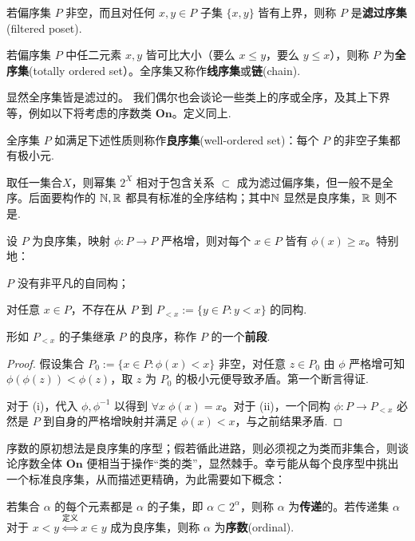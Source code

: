 \begin{definition}
	若偏序集 $P$ 非空，而且对任何 $x,y \in P$ 子集 $\{x,y\}$ 皆有上界，则称 $P$ 是\textbf{滤过序集}(filtered poset).
\end{definition}

\begin{definition}
	若偏序集 $P$ 中任二元素 $x,y$ 皆可比大小（要么 $x \leqslant y$，要么 $y \leqslant x$），则称 $P$ 为\textbf{全序集}(totally ordered set）。全序集又称作\textbf{线序集}或\textbf{链}(chain).
\end{definition}
显然全序集皆是滤过的。
我们偶尔也会谈论一些类上的序或全序，及其上下界等，例如以下将考虑的序数类 $\mathbf{On}$。定义同上.

\begin{definition}[Cantor]
	全序集 $P$ 如满足下述性质则称作\textbf{良序集}(well-ordered set)：每个 $P$ 的非空子集都有极小元.
\end{definition}

\begin{example}
	取任一集合$X$，则幂集 $2^X$ 相对于包含关系 $\subset$ 成为滤过偏序集，但一般不是全序。后面要构作的 $\mathbb{N},\mathbb{R}$ 都具有标准的全序结构；其中$\mathbb{N}$ 显然是良序集，$\mathbb{R}$ 则不是.
\end{example}

\begin{lemma}\label{prop:wellorder-automorphism}
	设 $P$ 为良序集，映射 $\phi: P \to P$ 严格增，则对每个 $x \in P$ 皆有 $\phi(x) \geqslant x$。特别地：
	\begin{inparaenum}[(i)]
		\item $P$ 没有非平凡的自同构；
		\item 对任意 $x \in P$，不存在从 $P$ 到 $P_{< x} := \{y \in P : y < x \}$ 的同构.
	\end{inparaenum}
\end{lemma}
形如 $P_{< x}$ 的子集继承 $P$ 的良序，称作 $P$ 的一个\textbf{前段}.
\begin{proof}
	假设集合 $P_0 := \{x \in P : \phi(x) < x \}$ 非空，对任意 $z \in P_0$ 由 $\phi$ 严格增可知 $\phi(\phi(z)) < \phi(z)$，取 $z$ 为 $P_0$ 的极小元便导致矛盾。第一个断言得证.

	对于 (i)，代入 $\phi, \phi^{-1}$ 以得到 $\forall x \; \phi(x)=x$。对于 (ii)，一个同构 $\phi: P \to P_{< x}$ 必然是 $P$ 到自身的严格增映射并满足 $\phi(x) < x$，与之前结果矛盾.
\end{proof}

序数的原初想法是良序集的序型；假若循此进路，则必须视之为类而非集合，则谈论序数全体 $\mathbf{On}$ 便相当于操作“类的类”，显然棘手。幸亏能从每个良序型中挑出一个标准良序集，从而描述更精确，为此需要如下概念：
\begin{definition}\label{def:ordinal}
	若集合 $\alpha$ 的每个元素都是 $\alpha$ 的子集，即 $\alpha \subset 2^\alpha$，则称 $\alpha$ 为\textbf{传递}的。若传递集 $\alpha$ 对于 $x < y \stackrel{\text{定义}}{\iff} x \in y$ 成为良序集，则称 $\alpha$ 为\textbf{序数}(ordinal).
\end{definition}

